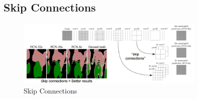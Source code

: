 \subsection*{Skip Connections}

\begin{figure}[h]
  \centering
  \includegraphics[width=0.8\textwidth]{Images/upsampling_layer/4.png}
  \caption{Skip Connections}
\end{figure}
